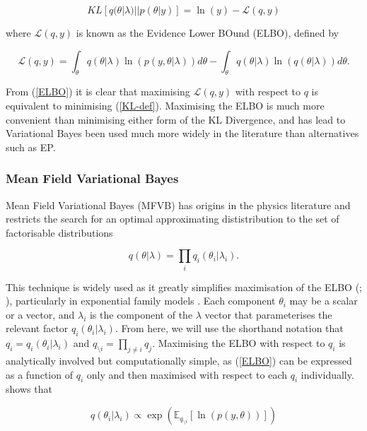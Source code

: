 \documentclass{article}\usepackage[]{graphicx}\usepackage[]{color}
\numberwithin{equation}{section}
\begin{document}
\begin{equation}
\label{KL-ELBO}
KL[q(\theta | \lambda)||p(\theta | y)] = \ln(y) - \mathcal{L}(q, y)
\end{equation}

where $\mathcal{L}(q, y)$ is known as the Evidence Lower BOund (ELBO), defined by

\begin{equation}
\label{ELBO}
\mathcal{L}(q, y) = \int_{\theta} q(\theta|\lambda) \ln (p(y, \theta|\lambda)) d\theta -  \int_{\theta} q(\theta|\lambda) \ln (q(\theta|\lambda)) d\theta.
\end{equation}

From (\ref{ELBO}) it is clear that maximising $\mathcal{L}(q, y)$ with respect to $q$ is equivalent to minimising (\ref{KL-def}). Maximising the ELBO is much more convenient than minimising either form of the KL Divergence, and has lead to Variational Bayes been used much more widely in the literature than alternatives such as EP.

\subsubsection{Mean Field Variational Bayes} 

Mean Field Variational Bayes (MFVB) has origins in the physics literature \citep{Chandler1987} and restricts the search for an optimal approximating dististribution to the set of factorisable distributions

\begin{equation}
\label{mf1}
q(\theta|\lambda) = \prod_i q_i(\theta_i | \lambda_i).
\end{equation}

This technique is widely used as it greatly simplifies maximisation of the ELBO (\citealp{Jordan1999}; \citealp{Bishop2006}), particularly in exponential family models \citep{Wainwright2008}. Each component $\theta_i$ may be a scalar or a vector, and $\lambda_i$ is the component of the $\lambda$ vector that parameterises the relevant factor $q_i(\theta_i |\lambda_i)$. From here, we will use the shorthand notation that $q_i = q_i(\theta_i|\lambda_i)$ and $q_{\setminus i} = \prod_{j\neq i}q_j$. Maximising the ELBO with respect to $q_i$ is analytically involved but computationally simple, as (\ref{ELBO}) can be expressed as a function of $q_i$ only and then maximised with respect to each $q_i$ individually. \citet{Attias1999} shows that 

\begin{equation}
\label{mf2}
q(\theta_i | \lambda_i) \propto\exp( \mathbb{E}_{q_{\setminus i}} [\ln(p(y,\theta))])
\end{equation}
\end{document}
